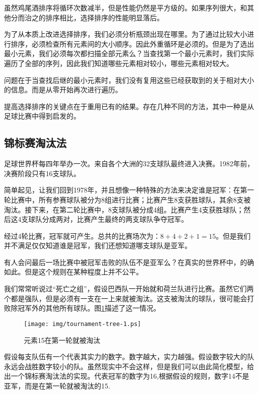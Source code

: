 \documentclass[UTF8]{article}
\begin{document}
虽然鸡尾酒排序将循环次数减半，但是性能仍然是平方级的。如果序列很大，和其他分而治之的排序相比，选择排序的性能明显落后。

为了从本质上改进选择排序，我们必须分析瓶颈出现在哪里。为了通过比较大小进行排序，必须检查所有元素间的大小顺序。因此外重循环是必须的。但是为了选出最小元素，我们必须每次都扫描全部元素么？当查找第一个最小元素时，我们实际遍历了全部的序列，因此我们知道哪些元素相对较小，哪些元素相对较大。

问题在于当查找后继的最小元素时，我们没有复用这些已经获取到的关于相对大小的信息。而是从零开始再次进行遍历。

提高选择排序的关键点在于重用已有的结果。存在几种不同的方法，其中一种是从足球比赛中得到启发的。

\subsection{锦标赛淘汰法}

足球世界杯每四年举办一次。来自各个大洲的32支球队最终进入决赛。1982年前，决赛阶段只有16支球队\cite{wiki-wc}。

简单起见，让我们回到1978年，并且想像一种特殊的方法来决定谁是冠军：在第一轮比赛中，所有参赛球队被分为8组进行比赛；比赛产生8支获胜球队，其余8支被淘汰。接下来，在第二轮比赛中，8支球队被分成4组。比赛产生4支获胜球队；然后这4支球队分成两对，比赛产生最终的两支球队争夺冠军。

经过4轮比赛，冠军就可产生。总共的比赛场次为：$8+4+2+1 = 15$。但是我们并不满足仅仅知道谁是冠军，我们还想知道哪支球队是亚军。

有人会问最后一场比赛中被冠军击败的队伍不是亚军么？在真实的世界杯中，的确如此。但是这个规则在某种程度上并不公平。

我们常常听说过“死亡之组”，假设巴西队一开始就和荷兰队进行比赛。虽然它们两个都是强队，但是必须有一支在一上来就被淘汰。这支被淘汰的球队，很可能会打败除冠军外的其他所有球队。图\ref{fig:tournament-tree-1}描述了这一情况。

\begin{figure}[htbp]
  \centering
  \texttt{[image: img/tournament-tree-1.ps]}
  \caption{元素15在第一轮就被淘汰}
  \label{fig:tournament-tree-1}
\end{figure}

假设每支队伍有一个代表其实力的数字。数字越大，实力越强。假设数字较大的队永远会战胜数字较小的队。虽然现实中不会这样，但是我们可以由此简化模型，给出一个锦标赛淘汰法的实现。代表冠军的数字为16,根据假设的规则，数字14不是亚军，而是在第一轮就被淘汰的15.
\end{document}
